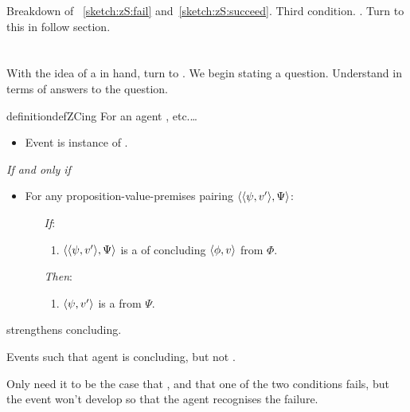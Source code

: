 \begin{note}
  Breakdown of ~\ref{sketch:zS:fail} and~\ref{sketch:zS:succeed}.
  Third condition.
  .
  Turn to this in follow section.
\end{note}

\section{}
\label{cha:zS:sec:question}

\begin{note}
  With the idea of a \curb{} in hand, turn to \zSN{}.
  We begin stating a question.
  Understand \zSN{} in terms of answers to the question.

  \begin{restatable}[\sCing{2}]{definition}{defZCing}
    \label{def:sCing}
    For an agent \vAgent{}, etc.\dots

    \begin{itemize}
    \item
      Event is instance of \sCing{}.
    \end{itemize}

    \emph{If and only if}

    \begin{itemize}
    \item
      For any proposition-value-premises pairing \(\langle \langle \psi, v' \rangle, \Psi \rangle\):
      \begin{itemize}
      \item[\emph{If}:]
        \begin{enumerate}[label=\alph*., ref=(\alph*)]
        \item
          \label{question:zs:option}
          \(\langle \langle \psi, v' \rangle, \Psi \rangle\) is a \curb{} of concluding \(\langle \phi, v \rangle\) from \(\Phi\).
        \end{enumerate}
      \item[\emph{Then}:]
        \begin{enumerate}[label=\alph*., ref=(\alph*), resume]
        \item
          \label{question:zs:may-fail}
          \(\langle \psi, v' \rangle\) is a \fc{} from \(\Psi\).
        \end{enumerate}
      \end{itemize}
    \end{itemize}
    \vspace{-\baselineskip}
  \end{restatable}

  \sCing{} strengthens concluding.

  \begin{proposition}
    Events such that agent is concluding, but not \sCing{}.
    \begin{argument}
      Only need it to be the case that \curb{}, and that one of the two conditions fails, but the event won't develop so that the agent recognises the failure.
    \end{argument}
  \end{proposition}
\end{note}


